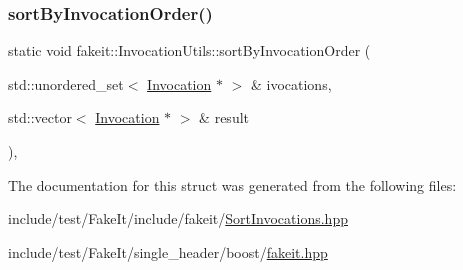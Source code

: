 \subsubsection{\texorpdfstring{sortByInvocationOrder()}{sortByInvocationOrder()}\hspace{0.1cm}{\footnotesize\ttfamily [9/9]}}
{\footnotesize\ttfamily static void fakeit\+::\+Invocation\+Utils\+::sort\+By\+Invocation\+Order (\begin{DoxyParamCaption}\item[{std\+::unordered\+\_\+set$<$ \mbox{\hyperlink{structfakeit_1_1Invocation}{Invocation}} $\ast$ $>$ \&}]{ivocations,  }\item[{std\+::vector$<$ \mbox{\hyperlink{structfakeit_1_1Invocation}{Invocation}} $\ast$ $>$ \&}]{result }\end{DoxyParamCaption})\hspace{0.3cm}{\ttfamily [inline]}, {\ttfamily [static]}}



The documentation for this struct was generated from the following files\+:\begin{DoxyCompactItemize}
\item 
include/test/\+Fake\+It/include/fakeit/\mbox{\hyperlink{SortInvocations_8hpp}{Sort\+Invocations.\+hpp}}\item 
include/test/\+Fake\+It/single\+\_\+header/boost/\mbox{\hyperlink{single__header_2boost_2fakeit_8hpp}{fakeit.\+hpp}}\end{DoxyCompactItemize}
